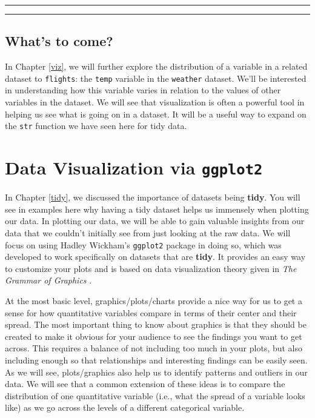 \documentclass[]{tufte-book}
\let\oldrule=\rule
\renewcommand{\rule}[1]{\oldrule{\linewidth}}
\begin{document}
\begin{center}\rule{0.5\linewidth}{\linethickness}\end{center}

\begin{center}\rule{0.5\linewidth}{\linethickness}\end{center}

\section{What's to come?}\label{whats-to-come}

In Chapter \ref{viz}, we will further explore the distribution of a
variable in a related dataset to \texttt{flights}: the \texttt{temp}
variable in the \texttt{weather} dataset. We'll be interested in
understanding how this variable varies in relation to the values of
other variables in the dataset. We will see that visualization is often
a powerful tool in helping us see what is going on in a dataset. It will
be a useful way to expand on the \texttt{str} function we have seen here
for tidy data.

\chapter{\texorpdfstring{Data Visualization via
\texttt{ggplot2}}{Data Visualization via ggplot2}}\label{data-visualization-via-ggplot2}

In Chapter \ref{tidy}, we discussed the importance of datasets being
\textbf{tidy}. You will see in examples here why having a tidy dataset
helps us immensely when plotting our data. In plotting our data, we will
be able to gain valuable insights from our data that we couldn't
initially see from just looking at the raw data. We will focus on using
Hadley Wickham's \texttt{ggplot2} package in doing so, which was
developed to work specifically on datasets that are \textbf{tidy}. It
provides an easy way to customize your plots and is based on data
visualization theory given in \emph{The Grammar of Graphics}
\citep{wilkinson2005}.

At the most basic level, graphics/plots/charts provide a nice way for us
to get a sense for how quantitative variables compare in terms of their
center and their spread. The most important thing to know about graphics
is that they should be created to make it obvious for your audience to
see the findings you want to get across. This requires a balance of not
including too much in your plots, but also including enough so that
relationships and interesting findings can be easily seen. As we will
see, plots/graphics also help us to identify patterns and outliers in
our data. We will see that a common extension of these ideas is to
compare the distribution of one quantitative variable (i.e., what the
spread of a variable looks like) as we go across the levels of a
different categorical variable.
\end{document}
